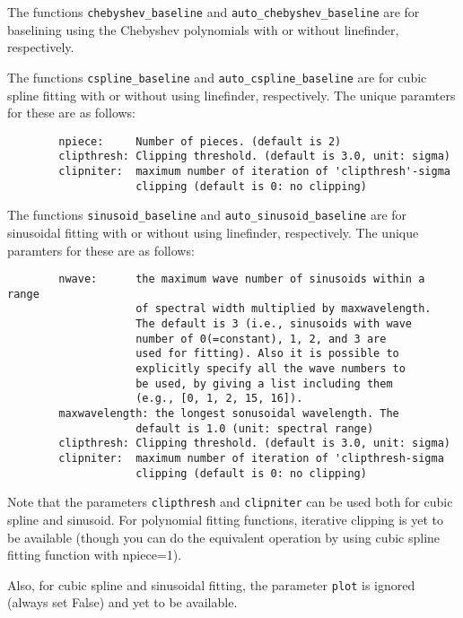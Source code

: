 The functions {\tt chebyshev\_baseline} and {\tt auto\_chebyshev\_baseline} 
are for baselining using the Chebyshev polynomials with or without linefinder, 
respectively. 

The functions {\tt cspline\_baseline} and {\tt auto\_cspline\_baseline} 
are for cubic spline fitting with or without using linefinder, respectively. 
The unique paramters for these are as follows:

\small
\begin{verbatim}
        npiece:     Number of pieces. (default is 2)
        clipthresh: Clipping threshold. (default is 3.0, unit: sigma)
        clipniter:  maximum number of iteration of 'clipthresh'-sigma 
                    clipping (default is 0: no clipping)
\end{verbatim}
\normalsize

The functions {\tt sinusoid\_baseline} and {\tt auto\_sinusoid\_baseline} 
are for sinusoidal fitting with or without using linefinder, respectively. 
The unique paramters for these are as follows:

\small
\begin{verbatim}
        nwave:      the maximum wave number of sinusoids within a range 
                    of spectral width multiplied by maxwavelength.
                    The default is 3 (i.e., sinusoids with wave 
                    number of 0(=constant), 1, 2, and 3 are 
                    used for fitting). Also it is possible to 
                    explicitly specify all the wave numbers to 
                    be used, by giving a list including them 
                    (e.g., [0, 1, 2, 15, 16]).
        maxwavelength: the longest sonusoidal wavelength. The 
                    default is 1.0 (unit: spectral range)
        clipthresh: Clipping threshold. (default is 3.0, unit: sigma)
        clipniter:  maximum number of iteration of 'clipthresh-sigma 
                    clipping (default is 0: no clipping)
\end{verbatim}
\normalsize

Note that the parameters {\tt clipthresh} and {\tt clipniter} can be used 
both for cubic spline and sinusoid. For polynomial fitting functions, 
iterative clipping is yet to be available (though you can do the equivalent 
operation by using cubic spline fitting function with npiece=1). 

Also, for cubic spline and sinusoidal fitting, the parameter {\tt plot} is 
ignored (always set False) and yet to be available. 


